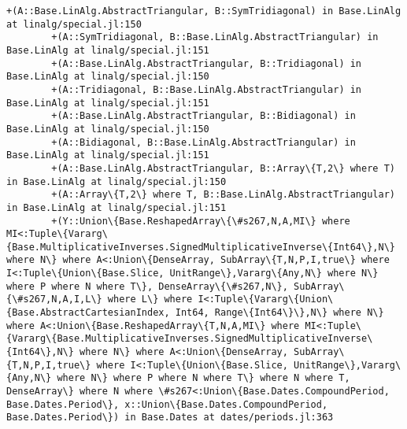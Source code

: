 \documentclass[11pt]{article}
\begin{document}
\begin{Verbatim}[commandchars=\\\{\}]
        +(A::Base.LinAlg.AbstractTriangular, B::SymTridiagonal) in Base.LinAlg at linalg/special.jl:150
        +(A::SymTridiagonal, B::Base.LinAlg.AbstractTriangular) in Base.LinAlg at linalg/special.jl:151
        +(A::Base.LinAlg.AbstractTriangular, B::Tridiagonal) in Base.LinAlg at linalg/special.jl:150
        +(A::Tridiagonal, B::Base.LinAlg.AbstractTriangular) in Base.LinAlg at linalg/special.jl:151
        +(A::Base.LinAlg.AbstractTriangular, B::Bidiagonal) in Base.LinAlg at linalg/special.jl:150
        +(A::Bidiagonal, B::Base.LinAlg.AbstractTriangular) in Base.LinAlg at linalg/special.jl:151
        +(A::Base.LinAlg.AbstractTriangular, B::Array\{T,2\} where T) in Base.LinAlg at linalg/special.jl:150
        +(A::Array\{T,2\} where T, B::Base.LinAlg.AbstractTriangular) in Base.LinAlg at linalg/special.jl:151
        +(Y::Union\{Base.ReshapedArray\{\#s267,N,A,MI\} where MI<:Tuple\{Vararg\{Base.MultiplicativeInverses.SignedMultiplicativeInverse\{Int64\},N\} where N\} where A<:Union\{DenseArray, SubArray\{T,N,P,I,true\} where I<:Tuple\{Union\{Base.Slice, UnitRange\},Vararg\{Any,N\} where N\} where P where N where T\}, DenseArray\{\#s267,N\}, SubArray\{\#s267,N,A,I,L\} where L\} where I<:Tuple\{Vararg\{Union\{Base.AbstractCartesianIndex, Int64, Range\{Int64\}\},N\} where N\} where A<:Union\{Base.ReshapedArray\{T,N,A,MI\} where MI<:Tuple\{Vararg\{Base.MultiplicativeInverses.SignedMultiplicativeInverse\{Int64\},N\} where N\} where A<:Union\{DenseArray, SubArray\{T,N,P,I,true\} where I<:Tuple\{Union\{Base.Slice, UnitRange\},Vararg\{Any,N\} where N\} where P where N where T\} where N where T, DenseArray\} where N where \#s267<:Union\{Base.Dates.CompoundPeriod, Base.Dates.Period\}, x::Union\{Base.Dates.CompoundPeriod, Base.Dates.Period\}) in Base.Dates at dates/periods.jl:363

\end{Verbatim}
\end{document}

